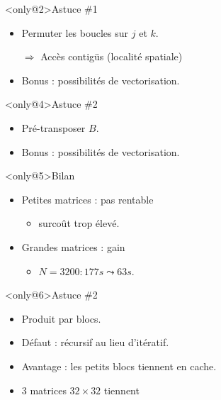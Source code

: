 \documentclass[xcolor={x11names,svgnames}]{beamer}
\begin{document}
\begin{frame}[label=applications,fragile]
\begin{overlayarea}{\textwidth}{4cm}
\begin{block}<only@2>{Astuce \#1}
\begin{itemize}
\item Permuter les boucles sur $j$ et $k$.
\item[$\Rightarrow$] Accès contigüs (localité spatiale)
\item Bonus : possibilités de vectorisation.
\end{itemize}
\end{block}


\begin{block}<only@4>{Astuce \#2}
\begin{itemize}
\item Pré-transposer $B$.
  
\item Bonus : possibilités de vectorisation.
\end{itemize}
\end{block}

\begin{exampleblock}<only@5>{Bilan}
  \begin{itemize}    
  \item Petites matrices : pas rentable
    \begin{itemize}
    \item surcoût trop élevé.
    \end{itemize}

  \item Grandes matrices : gain
    \begin{itemize}
    \item $N=3200 : 177s \leadsto 63s$.
    \end{itemize}
  \end{itemize}
\end{exampleblock}

\begin{block}<only@6>{Astuce \#2}
  \begin{itemize}
  \item Produit par blocs.
  
  \item Défaut : récursif au lieu d'itératif.

  \item Avantage : les petits blocs tiennent en cache.
  \item 3 matrices $32 \times 32$ tiennent 
  \end{itemize}
\end{block}
\end{overlayarea}
\end{frame}
\end{document}
